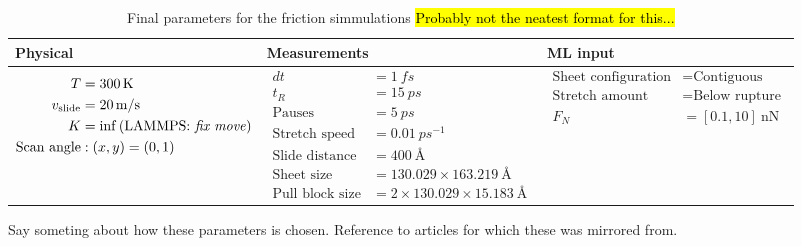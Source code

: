 \begin{table}[H]
  \begin{center}
  \caption{Final parameters for the friction simmulations \hl{Probably not the neatest format for this...}}
  \label{tab:final_param}
  \begin{tabular}{ | m{3cm} | m{3cm}| m{3cm} |} \hline
    Physical & Measurements & ML input \\ \hline
    {\begin{align*}
      T &= \SI{300}{K}  \\
      v_{\text{slide}} &= \SI{20}{m/s}  \\
      K &= \inf \text{(LAMMPS: \textit{fix move})}  \\
      \text{Scan angle} &:  (x,y) = (0,1)  
    \end{align*}} &
    {\begin{align*}
      dt &= \SI{1}{fs} \\
      t_R &= \SI{15}{ps} \\
      \text{Pauses} &= \SI{5}{ps} \\
      \text{Stretch speed} &= \SI{0.01}{ps^{-1}} \\
      \text{Slide distance} &= \SI{400}{Å} \\
      \text{Sheet size} &= 130.029 \times \SI{163.219}{\text{Å}} \\
      \text{Pull block size} &= 2 \times 130.029 \times \SI{15.183}{\text{Å}}
    \end{align*}} &
    {\begin{align*}
      \text{Sheet configuration} &= \text{Contiguous} \\
      \text{Stretch amount} &= \text{Below rupture} \\
      F_N &= [0.1, 10] \ \text{nN}
    \end{align*}}
    \\ \hline
  \end{tabular}
  \end{center}
\end{table}



Say someting about how these parameters is chosen. Reference to articles for which these was mirrored from. 






